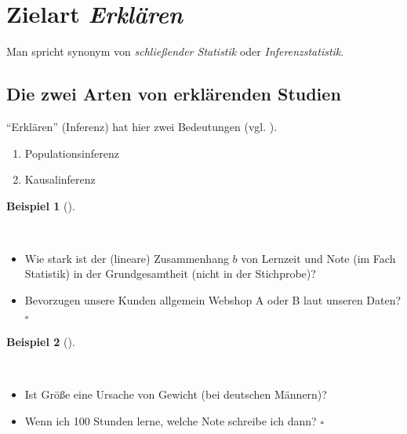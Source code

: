 \documentclass[
  ngerman,
  letterpaper,
  twoside,
  open=any]{scrbook}
\providecommand{\tightlist}{%
  \setlength{\itemsep}{0pt}\setlength{\parskip}{0pt}}\usepackage{longtable,booktabs,array}
\theoremstyle{definition}
\newtheorem{example}{Beispiel}[chapter]
\theoremstyle{plain}
\theoremstyle{definition}
\theoremstyle{definition}
\theoremstyle{remark}
\begin{document}
\section{\texorpdfstring{Zielart
\emph{Erklären}}{Zielart Erklären}}\label{zielart-erkluxe4ren}

Man spricht synonym von \emph{schließender Statistik} oder
\emph{Inferenzstatistik}.

\subsection{Die zwei Arten von erklärenden
Studien}\label{die-zwei-arten-von-erkluxe4renden-studien}

\enquote{Erklären} (Inferenz) hat hier zwei Bedeutungen (vgl.
).

\begin{enumerate}
\def\labelenumi{\arabic{enumi}.}
\tightlist
\item
  Populationsinferenz
\item
  Kausalinferenz
\end{enumerate}

\begin{example}[]\protect\hypertarget{exm-popinferenz}{}\label{exm-popinferenz}

~

\begin{itemize}
\tightlist
\item
  Wie stark ist der (lineare) Zusammenhang \(b\) von Lernzeit und Note
  (im Fach Statistik) in der Grundgesamtheit (nicht in der Stichprobe)?
\item
  Bevorzugen unsere Kunden allgemein Webshop A oder B laut unseren
  Daten? \(\square\)
\end{itemize}

\end{example}

\begin{example}[]\protect\hypertarget{exm-kausal}{}\label{exm-kausal}

~

\begin{itemize}
\tightlist
\item
  Ist Größe eine Ursache von Gewicht (bei deutschen Männern)?
\item
  Wenn ich 100 Stunden lerne, welche Note schreibe ich dann? \(\square\)
\end{itemize}

\end{example}
\end{document}
